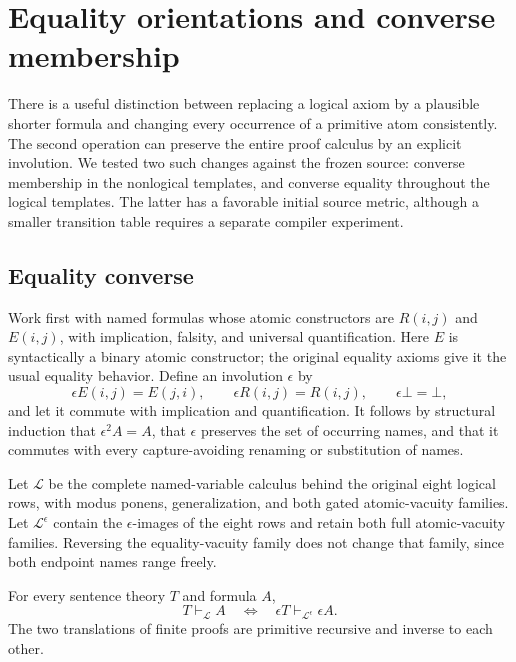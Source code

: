 \section{Equality orientations and converse membership}
\label{sec:converse-encodings}

There is a useful distinction between replacing a logical axiom by a
plausible shorter formula and changing every occurrence of a primitive atom
consistently.  The second operation can preserve the entire proof calculus
by an explicit involution.  We tested two such changes against the frozen
source: converse membership in the nonlogical templates, and converse
equality throughout the logical templates.  The latter has a favorable
initial source metric, although a smaller transition table requires a
separate compiler experiment.

\subsection{Equality converse}

Work first with named formulas whose atomic constructors are
$R(i,j)$ and $E(i,j)$, with implication, falsity, and universal
quantification.  Here $E$ is syntactically a binary atomic constructor;
the original equality axioms give it the usual equality behavior.
Define an involution $\epsilon$ by
\[
 \epsilon E(i,j)=E(j,i),\qquad
 \epsilon R(i,j)=R(i,j),\qquad
 \epsilon\bot=\bot,
\]
and let it commute with implication and quantification.
It follows by structural induction that $\epsilon^2 A=A$,
that $\epsilon$ preserves the set of occurring names, and that it
commutes with every capture-avoiding renaming or substitution of names.

Let $\mathcal L$ be the complete named-variable calculus behind the
original eight logical rows, with modus ponens, generalization, and
both gated atomic-vacuity families.  Let $\mathcal L^\epsilon$ contain
the $\epsilon$-images of the eight rows and retain both full
atomic-vacuity families.  Reversing the equality-vacuity family does
not change that family, since both endpoint names range freely.

\begin{theorem}
For every sentence theory $T$ and formula $A$,
\[
 T\vdash_{\mathcal L} A
 \quad\Longleftrightarrow\quad
 \epsilon T\vdash_{\mathcal L^\epsilon}\epsilon A.
\]
The two translations of finite proofs are primitive recursive and
inverse to each other.
\end{theorem}

